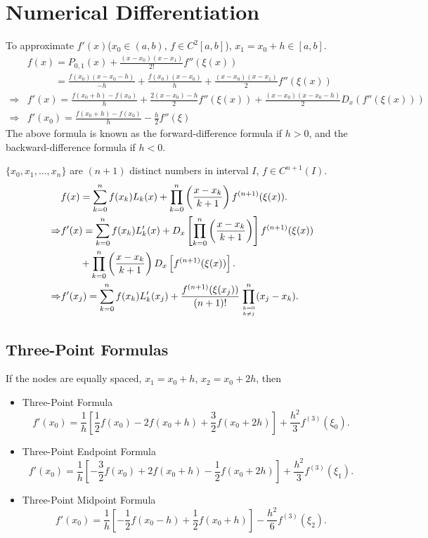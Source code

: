 \section{Numerical Differentiation}
To approximate $f'(x)$($x_0\in(a,b)$, $f\in C^2[a,b]$), $x_1=x_0+h\in[a,b]$.
\begin{align*}
    & f(x) = P_{0,1}(x)+\frac{(x-x_0)(x-x_1)}{2!}f''(\xi(x)) \\
    & \phantom{f(x)} = \frac{f(x_0)(x-x_0-h)}{-h}+\frac{f(x_0)(x-x_0)}{h}+\frac{(x-x_0)(x-x_1)}{2}f''(\xi(x)) \\
    \Rightarrow & f'(x) = \frac{f(x_0+h)-f(x_0)}{h}+\frac{2(x-x_0)-h}{2}f''(\xi(x))+\frac{(x-x_0)(x-x_0-h)}{2}D_x\left(f''(\xi(x))\right) \\
    \Rightarrow & f'(x_0)=\frac{f(x_0+h)-f(x_0)}{h}-\frac{h}{2}f''(\xi)
\end{align*}
The above formula is known as the forward-difference formula if $h>0$, and the backward-difference formula if $h<0$.

\begin{theo}
$\{x_0,x_1,\ldots,x_n\}$ are $(n+1)$ distinct numbers in interval $I$, $f\in C^{n+1}(I)$.
\begin{align*}
    & f(x) = \sum_{k=0}^nf(x_k)L_k(x)+\prod_{k=0}^n\left(\frac{x-x_k}{k+1}\right)f^{(n+1)}(\xi(x)). \\
    \Rightarrow & f'(x) = \sum_{k=0}^nf(x_k)L_k'(x)+D_x\left[\prod_{k=0}^n\left(\frac{x-x_k}{k+1}\right)\right]f^{(n+1)}(\xi(x)) \\
    & \phantom{f(x)} + \prod_{k=0}^n\left(\frac{x-x_k}{k+1}\right) D_x\left[f^{(n+1)}(\xi(x))\right]. \\
    \Rightarrow & f'(x_j) = \sum_{k=0}^nf(x_k)L_k'(x_j)+\frac{f^{(n+1)}(\xi(x_j))}{(n+1)!}\prod_{k=0 \atop k\neq j}^n(x_j-x_k).
\end{align*}
\end{theo}

\subsection{Three-Point Formulas}
If the nodes are equally spaced, $x_1=x_0+h$, $x_2=x_0+2h$, then
\begin{itemize}
    \item Three-Point Formula
    \[
     f'(x_0) = \frac{1}{h}\left[\frac{1}{2}f(x_0)-2f(x_0+h)+\frac{3}{2}f(x_0+2h)\right] + \frac{h^2}{3}f^{(3)}(\xi_0).
    \]
    \item Three-Point Endpoint Formula
    \[
     f'(x_0) = \frac{1}{h}\left[-\frac{3}{2}f(x_0)+2f(x_0+h)-\frac{1}{2}f(x_0+2h)\right] + \frac{h^2}{3}f^{(3)}(\xi_1).
    \]
    \item Three-Point Midpoint Formula
    \[
     f'(x_0) = \frac{1}{h}\left[-\frac{1}{2}f(x_0-h)+\frac{1}{2}f(x_0+h)\right] - \frac{h^2}{6}f^{(3)}(\xi_2).
    \]
\end{itemize}

